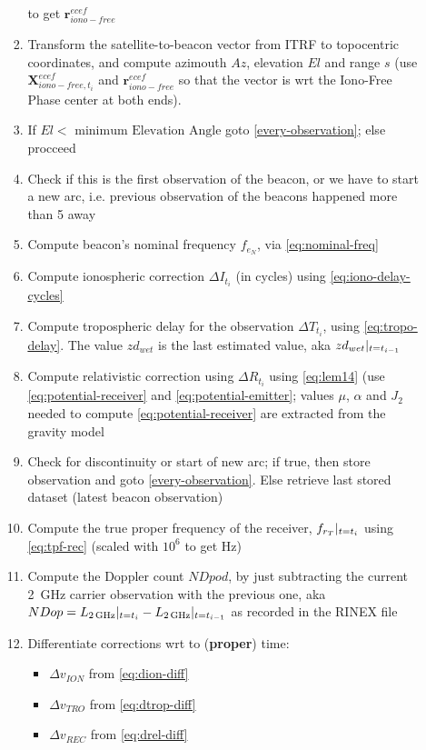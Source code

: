 \begin{enumerate}
\begin{enumerate}
\begin{enumerate}
              to get $\bm{r}^{ecef}_{iono-free}$
            \item Transform the satellite-to-beacon vector from ITRF to topocentric coordinates, 
              and compute azimouth $Az$, elevation $El$ and range $s$ (use $\bm{X}^{ecef}_{iono-free,t_i}$ and 
              $\bm{r}^{ecef}_{iono-free}$ so that the vector is wrt the Iono-Free 
              Phase center at both ends).
            \item If $El < \text{ minimum Elevation Angle}$ goto \ref{every-observation}; else procceed
            \item Check if this is the first observation of the beacon, or we have to start 
              a new arc, i.e. previous observation of the beacons happened more than 
              \SI{5}{\min} away
            \item Compute beacon's nominal frequency $f_{e_N}$, via \ref{eq:nominal-freq} 
            \item Compute ionospheric correction $\Delta I_{t_i}$ (in cycles) using \ref{eq:iono-delay-cycles}
            \item Compute tropospheric delay for the observation $\Delta T_{t_i}$, 
              using \ref{eq:tropo-delay}. The value $zd_{wet}$ is the last estimated 
              value, aka $zd_{wet}|_{t=t_{i-1}}$
            \item Compute relativistic correction using $\Delta R_{t_i}$ using \ref{eq:lem14}
              (use \ref{eq:potential-receiver} and \ref{eq:potential-emitter}; values 
              $\mu$, $\alpha$ and $J_2$ needed to compute \ref{eq:potential-receiver} 
              are extracted from the gravity model
            \item Check for discontinuity or start of new arc; if true, then store 
              observation and goto \ref{every-observation}. Else retrieve last 
              stored dataset (latest beacon observation)
            \item Compute the true proper frequency of the receiver, $f_{r_T}|_{t=t_i}$ 
              using \ref{eq:tpf-rec} (scaled with $10^6$ to get \si{\Hz})
            \item Compute the Doppler count $NDpod$, by just subtracting the current 
              \SI{2}{\GHz} carrier observation with the previous one, aka
              $NDop = L_{\SI{2}{\GHz}}\at{t=t_i} - L_{\SI{2}{\GHz}}\at{t=t_{i-1}}$
              as recorded in the RINEX file
            \item Differentiate corrections wrt to (\textbf{proper}) time:
              \begin{itemize}
                \item $\Delta v_{ION}$ from \ref{eq:dion-diff}
                \item $\Delta v_{TRO}$ from \ref{eq:dtrop-diff}
                \item $\Delta v_{REC}$ from \ref{eq:drel-diff}
              \end{itemize}
          \end{enumerate}
      \end{enumerate}
\end{enumerate}
